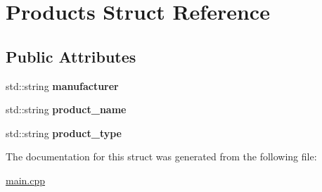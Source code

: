 \hypertarget{struct_products}{}\section{Products Struct Reference}
\label{struct_products}
\subsection*{Public Attributes}
\begin{DoxyCompactItemize}
\item 
\mbox{\label{struct_products_aaf7c7503abb209c62c82326795c70a59}} 
std\+::string {\bfseries manufacturer}
\item 
\mbox{\label{struct_products_a07d7175e87f6291e23a361945b260bae}} 
std\+::string {\bfseries product\+\_\+name}
\item 
\mbox{\label{struct_products_ae4a13eac751bedeceba1ccc0af007ab3}} 
std\+::string {\bfseries product\+\_\+type}
\end{DoxyCompactItemize}


The documentation for this struct was generated from the following file\+:\begin{DoxyCompactItemize}
\item 
\mbox{\hyperlink{main_8cpp}{main.\+cpp}}\end{DoxyCompactItemize}
